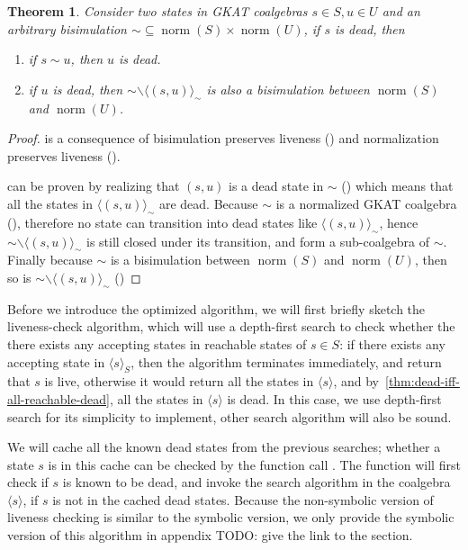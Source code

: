 \documentclass[conference]{IEEEtran}
\newtheorem{theorem}{Theorem}
\DeclareMathOperator{\norm}{\mathrm{norm}}
\begin{document}
\begin{theorem}\label{thm:greedy-bisim-one-dead}
    Consider two states in GKAT coalgebras \(s ∈ S, u ∈ U\) and an arbitrary bisimulation \({∼} ⊆ \norm(S) × \norm(U)\), if \(s\) is dead, then 
    \begin{enumerate}
        \item\label{itm:greedy-bisim-one-dead-then-both-dead} if \(s ∼ u\), then \(u\) is dead.
        \item\label{itm:remove-dead-pairs-sound} if \(u\) is dead, then \({∼} ∖ ⟨(s, u)⟩_∼\) is also a bisimulation between \(\norm(S)\) and \(\norm(U)\).
    \end{enumerate}
\end{theorem}

\begin{proof}
     is a consequence of bisimulation preserves liveness () and normalization preserves liveness ().

     can be proven by realizing that \((s, u)\) is a dead state in \(∼\) () which means that all the states in \(⟨(s, u)⟩_∼\) are dead.
    Because \(∼\) is a normalized GKAT coalgebra (), therefore no state can transition into dead states like \(⟨(s, u)⟩_∼\), hence \({∼} ∖ ⟨(s, u)⟩_∼\) is still closed under its transition, and form a sub-coalgebra of \(∼\).
    Finally because \(∼\) is a bisimulation between \(\norm(S)\) and \(\norm(U)\), then so is \({∼} ∖ ⟨(s, u)⟩_∼\) ()
\end{proof}

Before we introduce the optimized algorithm, we will first briefly sketch the liveness-check algorithm, which will use a depth-first search to check whether the there exists any accepting states in reachable states of \(s ∈ S\): if there exists any accepting state in \(⟨s⟩_S\), then the algorithm terminates immediately, and return that \(s\) is live, otherwise it would return all the states in \(⟨s⟩\), and by~\cref{thm:dead-iff-all-reachable-dead}, all the states in \(⟨s⟩\) is dead.
In this case, we use depth-first search for its simplicity to implement, other search algorithm will also be sound.

We will cache all the known dead states from the previous searches; whether a state \(s\) is in this cache can be checked by the function call . 
The function  will first check if \(s\) is known to be dead, and invoke the search algorithm in the coalgebra \(⟨s⟩\), if \(s\) is not in the cached dead states.
Because the non-symbolic version of liveness checking is similar to the symbolic version, we only provide the symbolic version of this algorithm in appendix
TODO: give the link to the section.
\end{document}
